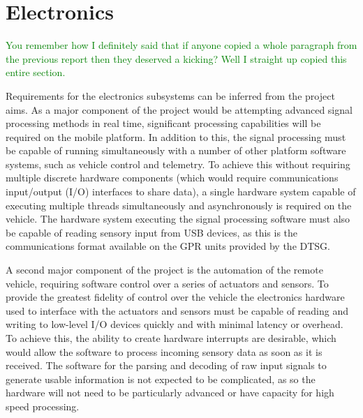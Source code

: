 \documentclass[main.tex]{subfiles}
\begin{document}
\section{Electronics}
\textcolor{green}{You remember how I definitely said that if anyone copied a whole paragraph from the previous report then they deserved a kicking? Well I straight up copied this entire section.}

Requirements for the electronics subsystems can be inferred from the project aims. As a major component of the project would be attempting advanced signal processing methods in real time, significant processing capabilities will be required on the mobile platform. In addition to this, the signal processing must be capable of running simultaneously with a number of other platform software systems, such as vehicle control and telemetry. To achieve this without requiring multiple discrete hardware components (which would require communications input/output (I/O) interfaces to share data), a single hardware system capable of executing multiple threads simultaneously and asynchronously is required on the vehicle. The hardware system executing the signal processing software must also be capable of reading sensory input from USB devices, as this is the communications format available on the GPR units provided by the DTSG. 
% 

A second major component of the project is the automation of the remote vehicle, requiring software control over a series of actuators and sensors. To provide the greatest fidelity of control over the vehicle the electronics hardware used to interface with the actuators and sensors must be capable of reading and writing to low-level I/O devices quickly and with minimal latency or overhead. To achieve this, the ability to create hardware interrupts are desirable, which would allow the software to process incoming sensory data as soon as it is received. The software for the parsing and decoding of raw input signals to generate usable information is not expected to be complicated, as so the hardware will not need to be particularly advanced or have capacity for high speed processing.
\end{document}
